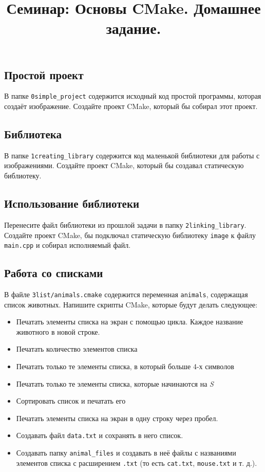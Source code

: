\documentclass{article}
\begin{document}
\title{Семинар: Основы CMake. Домашнее задание.\vspace{-5ex}}\date{}\maketitle
\subsection{Простой проект}
В папке \texttt{0simple\_project} содержится исходный код простой программы, которая создаёт изображение. Создайте проект CMake, который бы собирал этот проект.

\subsection{Библиотека}
В папке \texttt{1creating\_library} содержится код маленькой библиотеки для работы с изображениями.
Создайте проект CMake, который бы создавал статическую библиотеку.

\subsection{Использование библиотеки}
Перенесите файл библиотеки из прошлой задачи в папку \texttt{2linking\_library}. Создайте проект CMake, бы подключал статическую библиотеку \texttt{image} к файлу \texttt{main.cpp} и собирал исполняемый файл.

\subsection{Работа со списками}
В файле \texttt{3list/animals.cmake} содержится переменная \texttt{animals}, содержащая список животных. Напишите скрипты CMake, которые будут делать следующее:
\begin{itemize}
\item Печатать элементы списка на экран с помощью цикла. Каждое название животного в новой строке.
\item Печатать количество элементов списка
\item Печатать только те элементы списка, в который больше 4-х символов
\item Печатать только те элементы списка, которые начинаются на \textit{S}
\item Сортировать список и печатать его
\item Печатать элементы списка на экран в одну строку через пробел.
\item Создавать файл \texttt{data.txt} и сохранять в него список.
\item Создавать папку \texttt{animal\_files} и создавать в неё файлы с названиями элементов списка с расширением \texttt{.txt} (то есть \texttt{cat.txt}, \texttt{mouse.txt} и т. д.).
\end{itemize}
\end{document}
